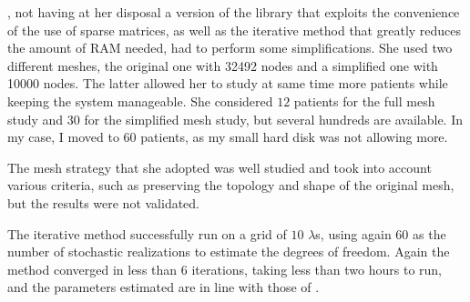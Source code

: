 \citeauthor{kim}, not having at her disposal a version of the library that
exploits the convenience of the use of sparse matrices, as well as the
iterative method that greatly reduces the amount of RAM needed, had to perform
some simplifications.  She used two different meshes, the original one with
32492 nodes and a simplified one with 10000 nodes. The latter allowed her to
study at same time more patients while keeping the system manageable.  She
considered $12$ patients for the full mesh study and $30$ for the simplified
mesh study, but several hundreds are available.  In my case, I moved to $60$
patients, as my small hard disk was not allowing more.

The mesh strategy that she adopted was well studied and took into account
various criteria, such as preserving the topology and shape of the original
mesh, but the results were not validated.

The iterative method successfully run on a grid of $10$ $\lambda$s, using again
60 as the number of stochastic realizations to estimate the degrees of freedom.
Again the method converged in less than 6 iterations, taking less than two
hours to run, and the parameters estimated are in line with those of
\cite{kim}.
